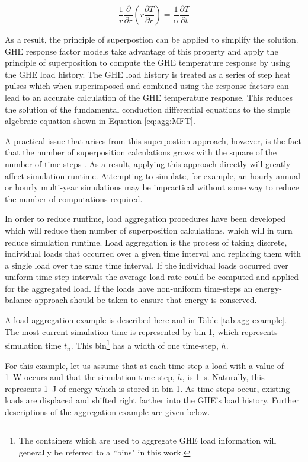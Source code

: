 \documentclass[review,12pt]{elsarticle}
\newcommand{\D}[2]{\frac{\partial #1}{\partial #2}}
\begin{document}
\begin{equation}
	\frac{1}{r} \D{}{r} \left(r \D{T}{r}\right) = \frac{1}{\alpha} \D{T}{t}
	\label{eq:agg:general conduction simplified}
\end{equation}

As a result, the principle of superpostion can be applied to simplify the solution. GHE response factor models take advantage of this property and apply the principle of superposition to compute the GHE temperature response by using the GHE load history. The GHE load history is treated as a series of step heat pulses which when superimposed and combined using the response factors can lead to an accurate calculation of the GHE temperature response. This reduces the solution of the fundamental conduction differential equations to the simple algebraic equation shown in Equation \ref{eq:agg:MFT}.

A practical issue that arises from this superpostion approach, however, is the fact that the number of superposition calculations grows with the square of the number of time-steps \citep{YavuzturkSpitler1999}. As a result, applying this approach directly will greatly affect simulation runtime. Attempting to simulate, for example, an hourly annual or hourly multi-year simulations may be impractical without some way to reduce the number of computations required.

In order to reduce runtime, load aggregation procedures have been developed which will reduce then number of superposition calculations, which will in turn reduce simulation runtime. Load aggregation is the process of taking discrete, individual loads that occurred over a given time interval and replacing them with a single load over the same time interval. If the individual loads occurred over uniform time-step intervals the average load rate could be computed and applied for the aggregated load. If the loads have non-uniform time-steps an energy-balance approach should be taken to ensure that energy is conserved.

A load aggregation example is described here and in Table \ref{tab:agg example}. The most current simulation time is represented by bin 1, which represents simulation time $t_n$. This bin\footnote{The containers which are used to aggregate GHE load information will generally be referred to a ``bins" in this work.} has a width of one time-step, $h$.

For this example, let us assume that at each time-step a load with a value of \SI{1}{\watt} occurs and that the simulation time-step, $h$, is \SI{1}{\second}. Naturally, this represents \SI{1}{\joule} of energy which is stored in bin 1. As time-steps occur, existing loads are displaced and shifted right farther into the GHE's load history. Further descriptions of the aggregation example are given below.
\end{document}
